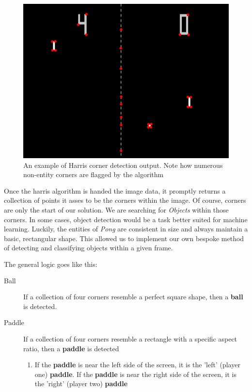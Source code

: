 \documentclass{report}
\newcommand{\pad}{\textbf{paddle}\xspace}
\newcommand{\ball}{\textbf{ball}\xspace}
\begin{document}
\begin{figure}
    \includegraphics[width=\textwidth]{pongCorners.jpg}
    \caption{An example of Harris corner detection output. Note how numerous non-entity corners are flagged by the algorithm}
    \label{fig:pongCorners}
\end{figure}

Once the harris algorithm is handed the image data, it promptly returns a collection of points it asses to be the corners within the image. Of course, corners are only the start of our solution. We are searching for \emph{Objects} within those corners. In some cases, object detection would be a task better suited for machine learning. Luckily, the entities of \emph{Pong} are consistent in size and always maintain a basic, rectangular shape. This allowed us to implement our own bespoke method of detecting and classifying objects within a given frame.

The general logic goes like this:

\begin{description}
    \item[Ball] If a collection of four corners resemble a perfect square shape, then a \ball is detected.  
    \item[Paddle] If a collection of four corners resemble a rectangle with a specific aspect ratio, then a \pad is detected
        \begin{enumerate}
            \item If the \pad is near the left side of the screen, it is the 'left' (player one) \pad. If the \pad is near the right side of the screen, it is the 'right' (player two) \pad
        \end{enumerate}
\end{description}
\end{document}
